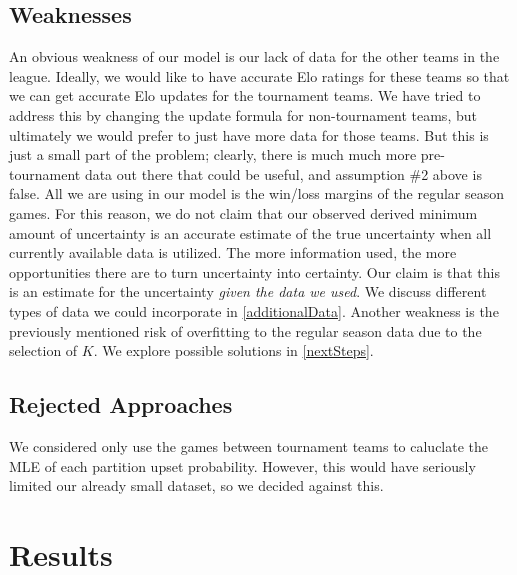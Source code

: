 \documentclass{article}
\begin{document}
\subsection{Weaknesses}
An obvious weakness of our model is our lack of data for the other teams in the league. Ideally, we would like to have accurate Elo ratings for these teams so that we can get accurate Elo updates for the tournament teams. We have tried to address this by changing the update formula for non-tournament teams, but ultimately we would prefer to just have more data for those teams. But this is just a small part of the problem; clearly, there is much much more pre-tournament data out there that could be useful, and assumption \#2 above is false. All we are using in our model is the win/loss margins of the regular season games. For this reason, we do not claim that our observed derived minimum amount of uncertainty is an accurate estimate of the true uncertainty when all currently available data is utilized. The more information used, the more opportunities there are to turn uncertainty into certainty. Our claim is that this is an estimate for the uncertainty \textit{given the data we used}. We discuss different types of data we could incorporate in \autoref{additionalData}. Another weakness is the previously mentioned risk of overfitting to the regular season data due to the selection of $K$. We explore possible solutions in \autoref{nextSteps}.

\subsection{Rejected Approaches}
We considered only use the games between tournament teams to caluclate the MLE of each partition upset probability. However, this would have seriously limited our already small dataset, so we decided against this. 


\section{Results}
\end{document}
